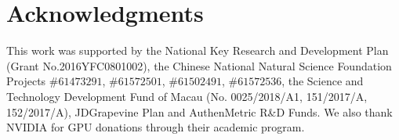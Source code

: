 \documentclass[runningheads]{llncs}
\begin{document}
\section*{Acknowledgments}
This work was supported by the National Key Research and Development Plan (Grant No.2016YFC0801002), the Chinese National Natural Science Foundation Projects $\#61473291$, $\#61572501$, $\#61502491$, $\#61572536$, the Science and Technology Development Fund of Macau (No. 0025/2018/A1, 151/2017/A, 152/2017/A), JDGrapevine Plan and AuthenMetric R\&D Funds. We also thank NVIDIA for GPU donations through their academic program.



\end{document}
